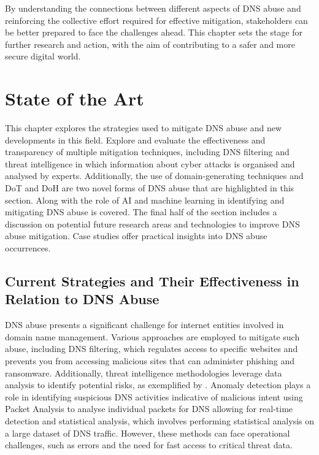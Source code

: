 By understanding the connections between different aspects of DNS abuse and reinforcing the collective effort required for effective mitigation, stakeholders can be better prepared to face the challenges ahead. This chapter sets the stage for further research and action, with the aim of contributing to a safer and more secure digital world.



\chapter{State of the Art}

This chapter explores the strategies used to mitigate DNS abuse and new developments in this field. Explore and evaluate the effectiveness and transparency of multiple mitigation techniques, including DNS filtering and threat intelligence in which information about cyber attacks is organised and analysed by experts. Additionally, the use of domain-generating techniques and DoT and DoH are two novel forms of DNS abuse that are highlighted in this section. Along with the role of AI and machine learning in identifying and mitigating DNS abuse is covered. The final half of the section includes a discussion on potential future research areas and technologies to improve DNS abuse mitigation. Case studies offer practical insights into DNS abuse occurrences. 


\section{Current Strategies and Their Effectiveness in Relation to DNS Abuse}


DNS abuse presents a significant challenge for internet entities involved in domain name management. Various approaches are employed to mitigate such abuse, including DNS filtering, which regulates access to specific websites and prevents you from accessing malicious sites that can administer phishing and ransomware. Additionally, threat intelligence methodologies leverage data analysis to identify potential risks, as exemplified by \cite{schmid2021thirty}. Anomaly detection plays a role in identifying suspicious DNS activities indicative of malicious intent using Packet Analysis to analyse individual packets for DNS allowing for real-time detection and statistical analysis, which involves performing statistical analysis on a large dataset of DNS traffic. However, these methods can face operational challenges, such as errors and the need for fast access to critical threat data. 


